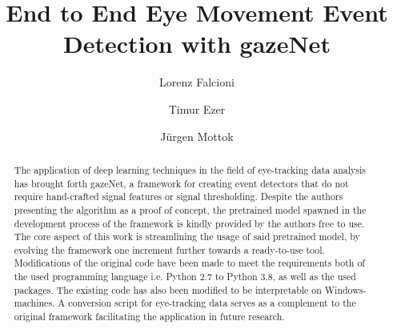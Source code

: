 \documentclass[acmlarge]{acmart}
\begin{document}
\title{End to End Eye Movement Event Detection with gazeNet}

\author{Lorenz Falcioni}

\author{Timur Ezer}

\author{Jürgen Mottok}


\begin{abstract}
    The application of deep learning techniques in the field of eye-tracking data analysis has brought forth gazeNet, a framework for creating event detectors that do not require hand-crafted signal features or signal thresholding. Despite the authors presenting the algorithm as a proof of concept, the pretrained model spawned in the development process of the framework is kindly provided by the authors free to use. The core aspect of this work is streamlining the usage of said pretrained model, by evolving the framework one increment further towards a ready-to-use tool. Modifications of the original code have been made to meet the requirements both of the used programming language i.e. Python 2.7 to Python 3.8, as well as the used packages. The existing code has also been modified to be interpretable on Windows-machines. A conversion script for eye-tracking data serves as a complement to the original framework facilitating the application in future research.
\end{abstract}

\maketitle


\end{document}

